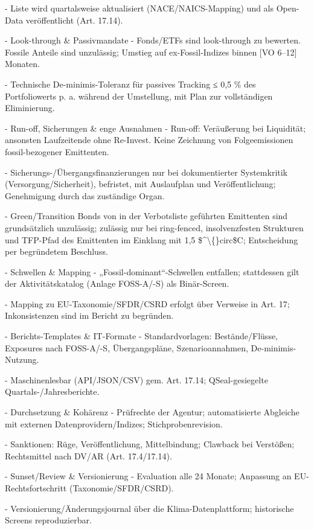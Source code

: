 \documentclass[12pt,a4paper]{scrartcl}
\begin{document}
- Liste wird quartalsweise aktualisiert (NACE/NAICS-Mapping) und als Open-Data veröffentlicht (Art. 17.14).

- Look-through \& Passivmandate
- Fonds/ETFs sind look-through zu bewerten. Fossile Anteile sind unzulässig; Umstieg auf ex-Fossil-Indizes binnen [VO 6--12] Monaten.

- Technische De-minimis-Toleranz für passives Tracking ≤ 0,5 \% des Portfoliowerts p. a. während der Umstellung, mit Plan zur vollständigen Eliminierung.

- Run-off, Sicherungen \& enge Ausnahmen
- Run-off: Veräußerung bei Liquidität; ansonsten Laufzeitende ohne Re-Invest. Keine Zeichnung von Folgeemissionen fossil-bezogener Emittenten.

- Sicherungs-/Übergangsfinanzierungen nur bei dokumentierter Systemkritik (Versorgung/Sicherheit), befristet, mit Auslaufplan und Veröffentlichung; Genehmigung durch das zuständige Organ.

- Green/Transition Bonds von in der Verbotsliste geführten Emittenten sind grundsätzlich unzulässig; zulässig nur bei ring-fenced, insolvenzfesten Strukturen und TFP-Pfad des Emittenten im Einklang mit 1,5 \$\textasciicircum{}\textbackslash\{\}circ\$C; Entscheidung per begründetem Beschluss.

- Schwellen \& Mapping
- „Fossil-dominant“-Schwellen entfallen; stattdessen gilt der Aktivitätskatalog (Anlage FOSS-A/-S) als Binär-Screen.

- Mapping zu EU-Taxonomie/SFDR/CSRD erfolgt über Verweise in Art. 17; Inkonsistenzen sind im Bericht zu begründen.

- Berichts-Templates \& IT-Formate
- Standardvorlagen: Bestände/Flüsse, Exposures nach FOSS-A/-S, Übergangspläne, Szenarioannahmen, De-minimis-Nutzung.

- Maschinenlesbar (API/JSON/CSV) gem. Art. 17.14; QSeal-gesiegelte Quartals-/Jahresberichte.

- Durchsetzung \& Kohärenz
- Prüfrechte der Agentur; automatisierte Abgleiche mit externen Datenprovidern/Indizes; Stichprobenrevision.

- Sanktionen: Rüge, Veröffentlichung, Mittelbindung; Clawback bei Verstößen; Rechtsmittel nach DV/AR (Art. 17.4/17.14).

- Sunset/Review \& Versionierung
- Evaluation alle 24 Monate; Anpassung an EU-Rechtsfortschritt (Taxonomie/SFDR/CSRD).

- Versionierung/Änderungsjournal über die Klima-Datenplattform; historische Screens reproduzierbar.
\end{document}
